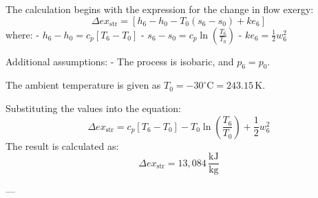 The calculation begins with the expression for the change in flow exergy:  
\[
\Delta ex_{\text{str}} = \left[ h_6 - h_0 - T_0 (s_6 - s_0) + ke_6 \right]
\]  
where:  
- \( h_6 - h_0 = c_p [T_6 - T_0] \)  
- \( s_6 - s_0 = c_p \ln \left( \frac{T_6}{T_0} \right) \)  
- \( ke_6 = \frac{1}{2} w_6^2 \)  

Additional assumptions:  
- The process is isobaric, and \( p_6 = p_0 \).  

The ambient temperature is given as \( T_0 = -30^\circ\text{C} = 243.15 \, \text{K} \).  

Substituting the values into the equation:  
\[
\Delta ex_{\text{str}} = c_p \left[ T_6 - T_0 \right] - T_0 \ln \left( \frac{T_6}{T_0} \right) + \frac{1}{2} w_6^2
\]  
The result is calculated as:  
\[
\Delta ex_{\text{str}} = 13,084 \, \frac{\text{kJ}}{\text{kg}}
\]  

---